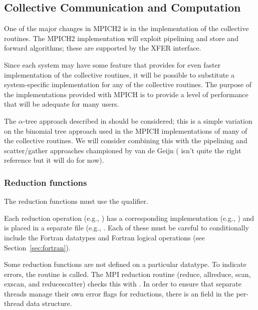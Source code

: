 \subsection{Collective Communication and Computation}
\label{sec:collective-comm}

One of the major changes in MPICH2 is in the implementation of the
collective routines.  The MPICH2 implementation will exploit
pipelining and store and forward algorithms; these are supported by
the XFER interface. 

Since each system may have some feature that provides for even faster
implementation of the collective routines, it will be possible to
substitute a system-specific implementation for any of the collective
routines.  The purpose of the implementations provided with MPICH is
to provide a level of performance that will be adequate
for many users.  

The $\alpha$-tree approach described in
\cite{bern:mpi-collective:hpcn99} should be considered; this is a
simple variation on the binomial tree approach used in the MPICH
implementations of many of the collective routines.  We will consider
combining this with the pipelining and scatter/gather approaches
championed by van de Geijn (\cite{vandegeijn} isn't quite the right
reference but it will do for now).

\subsubsection{Reduction functions}
The reduction functions must use the  qualifier.

Each reduction operation (e.g., ) has a corresponding
implementation (e.g., ) and is placed in a separate file (e.g.,
.  Each of these must be careful to conditionally include the
Fortran datatypes and Fortran logical operations (see
Section~\ref{sec:fortran}).

Some reduction functions are not defined on a particular datatype.  To
indicate errors, the routine  is called.
The MPI reduction routine (reduce, allreduce, scan, exscan, and reducescatter)
checks this with .  In order to ensure that
separate threads manage their own error flags for reductions, there is
an  field in the per-thread data
structure.

